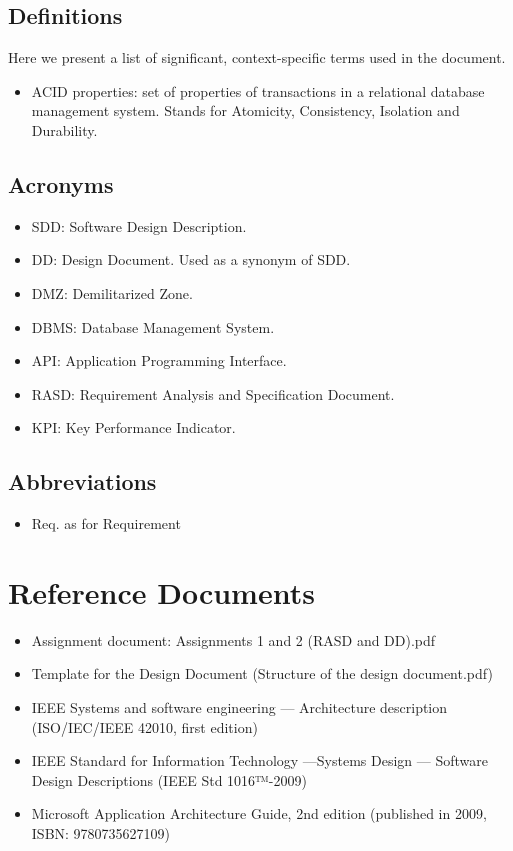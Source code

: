 \subsection{Definitions}
Here we present a list of significant, context-specific terms used in the document. 
\begin{itemize}
	\item ACID properties: set of properties of transactions in a relational database management system. Stands for Atomicity, Consistency, Isolation and Durability.
\end{itemize}
\subsection{Acronyms}
\begin{itemize}
	\item SDD: Software Design Description.
	\item DD: Design Document. Used as a synonym of SDD.
	\item DMZ: Demilitarized Zone.
	\item DBMS: Database Management System.
	\item API: Application Programming Interface.
	\item RASD: Requirement Analysis and Specification Document.
	\item KPI: Key Performance Indicator.
\end{itemize}
\subsection{Abbreviations}
\begin{itemize}
	\item Req. as for Requirement
\end{itemize}
\section{Reference Documents}
\begin{itemize}
	\item Assignment document: Assignments 1 and 2 (RASD and DD).pdf
	\item Template for the Design Document (Structure of the design document.pdf)
 	\item IEEE Systems and software engineering — Architecture description (ISO/IEC/IEEE 42010, first edition)
 	\item IEEE Standard for Information Technology —Systems Design — Software Design Descriptions (IEEE Std 1016™-2009)
 	\item Microsoft Application Architecture Guide, 2nd edition (published in 2009, ISBN: 9780735627109)
\end{itemize} 
 
